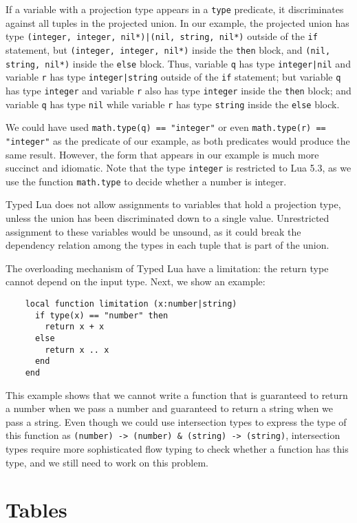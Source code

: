 If a variable with a projection type appears in a \texttt{type} predicate,
it discriminates against all tuples in the projected union.
In our example, the projected union has type
\texttt{(integer, integer, nil*)|(nil, string, nil*)} outside of the
\texttt{if} statement,
but \texttt{(integer, integer, nil*)} inside the \texttt{then} block,
and \texttt{(nil, string, nil*)} inside the \texttt{else} block.
Thus, variable \texttt{q} has type \texttt{integer|nil} and variable
\texttt{r} has type \texttt{integer|string} outside of the
\texttt{if} statement;
but variable \texttt{q} has type \texttt{integer} and variable \texttt{r} also
has type \texttt{integer} inside the \texttt{then} block;
and variable \texttt{q} has type \texttt{nil} while variable \texttt{r}
has type \texttt{string} inside the \texttt{else} block.

We could have used \texttt{math.type(q) == "integer"} or
even \texttt{math.type(r) == "integer"} as the predicate of our example,
as both predicates would produce the same result.
However, the form that appears in our example is much more succinct and idiomatic.
Note that the type \texttt{integer} is restricted to Lua 5.3,
as we use the function \texttt{math.type} to decide whether a number is integer.

Typed Lua does not allow assignments to variables that hold a projection type,
unless the union has been discriminated down to a single value.
Unrestricted assignment to these variables would be unsound,
as it could break the dependency relation among the types in each tuple
that is part of the union.

The overloading mechanism of Typed Lua have a limitation:
the return type cannot depend on the input type.
Next, we show an example:
\begin{verbatim}
    local function limitation (x:number|string)
      if type(x) == "number" then
        return x + x
      else
        return x .. x
      end
    end
\end{verbatim}

This example shows that we cannot write a function that is
guaranteed to return a number when we pass a number and
guaranteed to return a string when we pass a string.
Even though we could use intersection types to express the type
of this function as
\texttt{(number) -> (number) \string& (string) -> (string)},
intersection types require more sophisticated flow typing to
check whether a function has this type,
and we still need to work on this problem.

\section{Tables}
\label{sec:tables}

